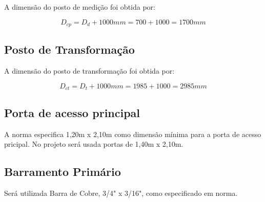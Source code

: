 A dimensão do posto de medição foi obtida por:

\begin{equation}
D_{cp} = D_{d} + 1000mm = 700 + 1000 = 1700mm
\end{equation}

\subsection{Posto de Transformação}

A dimensão do posto de transformação foi obtida por:

\begin{equation}
D_{ct} = D_{t} + 1000mm = 1985 + 1000 = 2985mm
\end{equation}

\subsection{Porta de acesso principal}

A norma especifica 1,20m x 2,10m como dimensão mínima para a porta de acesso pricipal. No projeto será usada portas de 1,40m x 2,10m.	

\subsection{Barramento Primário}

Será utilizada Barra de Cobre, 3/4" x 3/16", como especificado em norma.

